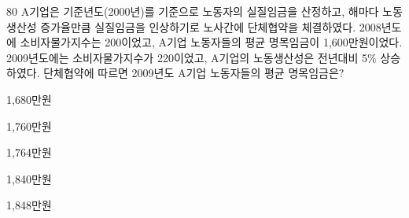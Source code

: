 \begin{question}{80}
A기업은 기준년도(2000년)를 기준으로 노동자의 실질임금을 산정하고, 해마다 노동생산성 증가율만큼 실질임금을 인상하기로 노사간에 단체협약을 체결하였다. 2008년도에 소비자물가지수는 200이었고, A기업 노동자들의 평균 명목임금이 1,600만원이었다. 2009년도에는 소비자물가지수가 220이었고, A기업의 노동생산성은 전년대비 5\% 상승하였다. 단체협약에 따르면 2009년도 A기업 노동자들의 평균 명목임금은?
\begin{choices}
  \item 1,680만원
  \item 1,760만원
  \item 1,764만원
  \item 1,840만원
  \item 1,848만원
\end{choices}
\end{question}
